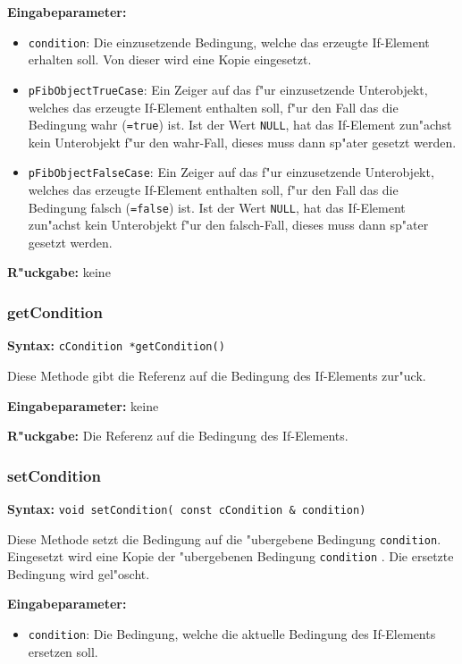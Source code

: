 \bigskip\noindent
\textbf{Eingabeparameter:}
\begin{itemize}
 \item \verb|condition|: Die einzusetzende Bedingung, welche das erzeugte If-Element erhalten soll. Von dieser wird eine Kopie eingesetzt.
 \item \verb|pFibObjectTrueCase|: Ein Zeiger auf das f"ur einzusetzende Unterobjekt, welches das erzeugte If-Element enthalten soll, f"ur den Fall das die Bedingung wahr (\verb|=true|) ist. Ist der Wert \verb|NULL|, hat das If-Element zun"achst kein Unterobjekt f"ur den wahr-Fall, dieses muss dann sp"ater gesetzt werden.
 \item \verb|pFibObjectFalseCase|: Ein Zeiger auf das f"ur einzusetzende Unterobjekt, welches das erzeugte If-Element enthalten soll, f"ur den Fall das die Bedingung falsch (\verb|=false|) ist. Ist der Wert \verb|NULL|, hat das If-Element zun"achst kein Unterobjekt f"ur den falsch-Fall, dieses muss dann sp"ater gesetzt werden.
\end{itemize}

\bigskip\noindent
\textbf{R"uckgabe:} keine


\subsubsection{getCondition}

\textbf{Syntax:} \verb|cCondition *getCondition()|

\bigskip\noindent
Diese Methode gibt die Referenz auf die Bedingung des If-Elements zur"uck.

\bigskip\noindent
\textbf{Eingabeparameter:} keine

\bigskip\noindent
\textbf{R"uckgabe:} Die Referenz auf die Bedingung des If-Elements.


\subsubsection{setCondition}

\textbf{Syntax:} \verb|void setCondition( const cCondition & condition)|

\bigskip\noindent
Diese Methode setzt die Bedingung auf die "ubergebene Bedingung \verb|condition|. Eingesetzt wird eine Kopie der "ubergebenen Bedingung \verb|condition| . Die ersetzte Bedingung wird gel"oscht.

\bigskip\noindent
\textbf{Eingabeparameter:}
\begin{itemize}
 \item \verb|condition|: Die Bedingung, welche die aktuelle Bedingung des If-Elements ersetzen soll.
\end{itemize}

